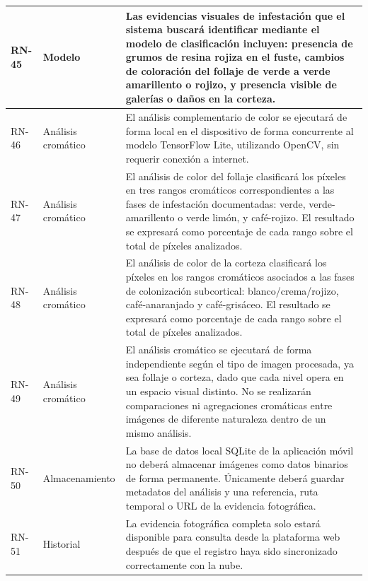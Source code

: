 \begin{longtable}{|>{\centering\arraybackslash}m{1.8cm}|>{\centering\arraybackslash}m{2.5cm}|m{9.5cm}|}
RN-45 & Modelo & Las evidencias visuales de infestación que el sistema buscará identificar mediante el modelo de clasificación incluyen: presencia de grumos de resina rojiza en el fuste, cambios de coloración del follaje de verde a verde amarillento o rojizo, y presencia visible de galerías o daños en la corteza. \\
\hline








RN-46 & Análisis cromático & El análisis complementario de color se ejecutará de forma local en el dispositivo de forma concurrente al modelo TensorFlow Lite, utilizando OpenCV, sin requerir conexión a internet. \\
\hline
RN-47 & Análisis cromático & El análisis de color del follaje clasificará los píxeles en tres rangos cromáticos correspondientes a las fases de infestación documentadas: verde, verde-amarillento o verde limón, y café-rojizo. El resultado se expresará como porcentaje de cada rango sobre el total de píxeles analizados. \\
\hline
RN-48 & Análisis cromático & El análisis de color de la corteza clasificará los píxeles en los rangos cromáticos asociados a las fases de colonización subcortical: blanco/crema/rojizo, café-anaranjado y café-grisáceo. El resultado se expresará como porcentaje de cada rango sobre el total de píxeles analizados. \\












\hline
RN-49 & Análisis cromático & El análisis cromático se ejecutará de forma independiente según el tipo de imagen procesada, ya sea follaje o corteza, dado que cada nivel opera en un espacio visual distinto. No se realizarán comparaciones ni agregaciones cromáticas entre imágenes de diferente naturaleza dentro de un mismo análisis. \\
\hline

RN-50 & Almacenamiento & La base de datos local SQLite de la aplicación móvil no deberá almacenar imágenes como datos binarios de forma permanente. Únicamente deberá guardar metadatos del análisis y una referencia, ruta temporal o URL de la evidencia fotográfica.\\
\hline


RN-51 & Historial & La evidencia fotográfica completa solo estará disponible para consulta desde la plataforma web después de que el registro haya sido sincronizado correctamente con la nube.\\
\hline


\end{longtable}
